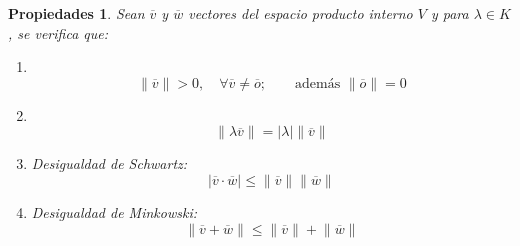 \documentclass[a4paper,11pt]{article}
\theoremstyle{teoremas}
\theoremstyle{ejemplos}
\theoremstyle{definiciones}
\theoremstyle{lemas}
\newtheorem*{propiedades}{Propiedades}
\begin{document}
\begin{propiedades}
 Sean $\overline{v}$ y $\overline{w}$ vectores del espacio producto interno $V$ y para $\lambda \in K$, se verifica que:
 \begin{enumerate}
  \item $\phantom{0}$
  \begin{equation}
   \lVert \overline{v} \rVert > 0, \quad \forall \overline{v} \neq \overline{o}; \qquad \text{adem\'as } \lVert \overline{o} \rVert = 0
  \end{equation}

  \item $\phantom{0}$
  \begin{equation}
   \lVert \lambda \overline{v} \rVert = \lvert \lambda \rvert \lVert \overline{v} \rVert
  \end{equation}

  \item Desigualdad de Schwartz:
  \begin{equation}
   \lvert \overline{v} \cdot \overline{w} \rvert \leq \lVert \overline{v} \rVert \lVert \overline{w} \rVert
  \end{equation}

  \item Desigualdad de Minkowski:
  \begin{equation}
   \lVert \overline{v} + \overline{w} \rVert \leq \lVert \overline{v} \rVert + \lVert \overline{w} \rVert
  \end{equation}

 \end{enumerate}
\end{propiedades}
\end{document}
